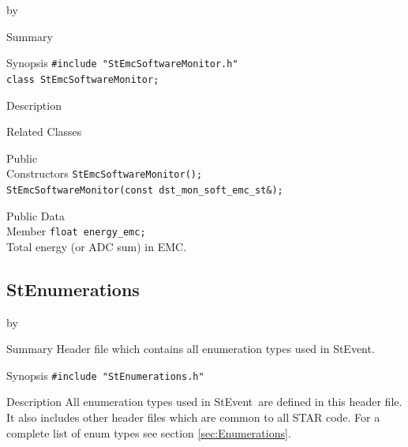 \documentclass[twoside]{article}
\newcommand{\StEvent}{\textsf{StEvent}}
\newcommand{\entrylabel}[1]{\mbox{\textbf{{#1}}}\hfil}%
\newenvironment{entry}
{\begin{list}{}%
    {\renewcommand{\makelabel}{\entrylabel}%
     \setlength{\labelwidth}{90pt}%
     \setlength{\leftmargin}{\labelwidth}
     \advance\leftmargin by \labelsep%
      }%
    }%
  {\end{list}}
\newcommand{\Entrylabel}[1]%
{\raisebox{0pt}[1ex][0pt]{\makebox[\labelwidth][l]%
    {\parbox[t]{\labelwidth}{\hspace{0pt}\textbf{{#1}}}}}}
\newenvironment{Entry}%
{\renewcommand{\entrylabel}{\Entrylabel}\begin{entry}}%
  {\end{entry}}
\begin{document}
\begin{Entry}
\item[Summary]
\item[Synopsis]
    \verb+#include "StEmcSoftwareMonitor.h"+\\
    \verb+class StEmcSoftwareMonitor;+\\
\item[Description]
\item[Related Classes]
\item[Public\\ Constructors]
    \verb+StEmcSoftwareMonitor();+\\
    \verb+StEmcSoftwareMonitor(const dst_mon_soft_emc_st&);+\\
\item[Public Data\\ Member]
    \verb+float energy_emc;+\\
    Total energy (or ADC sum) in EMC.
\end{Entry}
\clearpage


\subsection{StEnumerations}
\label{sec:StEnumerations}
\begin{Entry}
\item[Summary] Header file which contains all enumeration types used
    in \StEvent.
\item[Synopsis]
    \verb+#include "StEnumerations.h"+\\
\item[Description] All enumeration types used in \StEvent\ are defined
    in this header file. It also includes other header files which are
    common to all STAR code. For a complete list of enum types see
    section \ref{sec:Enumerations}.
\end{Entry}
\clearpage
\end{document}
